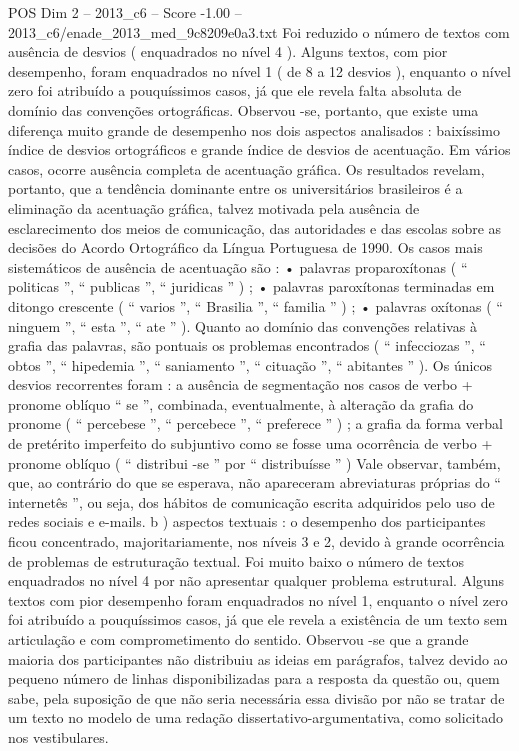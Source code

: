 \begin{textsample}{POS Dim 2 – 2013\_c6 – Score -1.00 – 2013\_c6/enade\_2013\_med\_9c8209e0a3.txt}
Foi reduzido o número de textos com ausência de desvios ( enquadrados no nível 4 ).
Alguns textos, com pior desempenho, foram enquadrados no nível 1 ( de 8 a 12 desvios ), enquanto o nível zero foi atribuído a pouquíssimos casos, já que ele revela falta absoluta de domínio das convenções ortográficas.
Observou -se, portanto, que existe uma diferença muito grande de desempenho nos dois aspectos analisados : baixíssimo índice de desvios ortográficos e grande índice de desvios de acentuação.
Em vários casos, ocorre ausência completa de acentuação gráfica.
Os resultados revelam, portanto, que a tendência dominante entre os universitários brasileiros é a eliminação da acentuação gráfica, talvez motivada pela ausência de esclarecimento dos meios de comunicação, das autoridades e das escolas sobre as decisões do Acordo Ortográfico da Língua Portuguesa de 1990.
Os casos mais sistemáticos de ausência de acentuação são : • palavras proparoxítonas ( “ politicas ”, “ publicas ”, “ juridicas ” ) ; • palavras paroxítonas terminadas em ditongo crescente ( “ varios ”, “ Brasilia ”, “ familia ” ) ; • palavras oxítonas ( “ ninguem ”, “ esta ”, “ ate ” ).
Quanto ao domínio das convenções relativas à grafia das palavras, são pontuais os problemas encontrados ( “ infecciozas ”, “ obtos ”, “ hipedemia ”, “ saniamento ”, “ cituação ”, “ abitantes ” ).
Os únicos desvios recorrentes foram : a ausência de segmentação nos casos de verbo + pronome oblíquo “ se ”, combinada, eventualmente, à alteração da grafia do pronome ( “ percebese ”, “ percebece ”, “ preferece ” ) ; a grafia da forma verbal de pretérito imperfeito do subjuntivo como se fosse uma ocorrência de verbo + pronome oblíquo ( “ distribui -se ” por “ distribuísse ” ) Vale observar, também, que, ao contrário do que se esperava, não apareceram abreviaturas próprias do “ internetês ”, ou seja, dos hábitos de comunicação escrita adquiridos pelo uso de redes sociais e e-mails. b ) aspectos textuais : o desempenho dos participantes ficou concentrado, majoritariamente, nos níveis 3 e 2, devido à grande ocorrência de problemas de estruturação textual.
Foi muito baixo o número de textos enquadrados no nível 4 por não apresentar qualquer problema estrutural.
Alguns textos com pior desempenho foram enquadrados no nível 1, enquanto o nível zero foi atribuído a pouquíssimos casos, já que ele revela a existência de um texto sem articulação e com comprometimento do sentido.
Observou -se que a grande maioria dos participantes não distribuiu as ideias em parágrafos, talvez devido ao pequeno número de linhas disponibilizadas para a resposta da questão ou, quem sabe, pela suposição de que não seria necessária essa divisão por não se tratar de um texto no modelo de uma redação dissertativo-argumentativa, como solicitado nos vestibulares.

\end{textsample}
